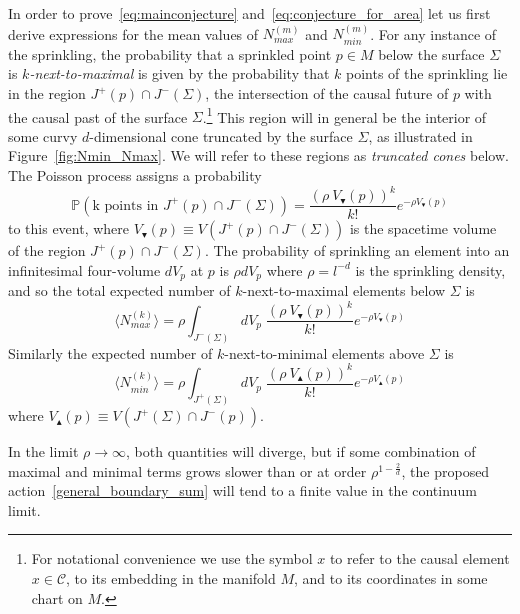 \documentclass[12pt]{article}
\newcommand{\be}{\begin{equation}}
\newcommand{\ee}{\end{equation}}
\begin{document}
In order to prove~\eqref{eq:mainconjecture} and~\eqref{eq:conjecture_for_area} let us first derive expressions for the mean values of $N_{max}^{(m)}$ and $N_{min}^{(m)}$. For any instance of the sprinkling, the probability that a sprinkled point $p\in M$ below the surface $\Sigma$ is $k$\emph{-next-to-maximal} is given by the probability that $k$ points of the sprinkling lie in the region $J^{+}(p)\cap J^{-}(\Sigma)$, the intersection of the causal future of $p$ with the causal past of the surface $\Sigma$.\footnote{For notational convenience we use the symbol $x$ to refer to the causal element $x\in\mathcal C$, to its embedding in the manifold $M$, and to its coordinates in some chart on $M$.} This region will in general be the interior of some curvy $d$-dimensional cone truncated by the surface $\Sigma$, as illustrated in Figure~\ref{fig:Nmin_Nmax}. We will refer to these regions as \emph{truncated cones} below. The Poisson process assigns a probability
\be\label{Poisson}
\mathbb P\left(\text{k points in }J^{+}(p)\cap J^{-}(\Sigma)\right)=\frac{\left(\rho\: V_\blacktriangledown(p)\right)^k}{k!}e^{-\rho V_\blacktriangledown(p)}
\ee
to this event, where $V_\blacktriangledown(p)\equiv V(J^{+}(p)\cap J^{-}(\Sigma))$ is the spacetime volume of the region $J^{+}(p)\cap J^{-}(\Sigma)$. The probability of sprinkling an element into an infinitesimal four-volume $dV_p$ at $p$ is $\rho dV_p$ where $\rho=l^{-d}$ is the sprinkling density, and so the total expected number of $k$-next-to-maximal elements below $\Sigma$ is
\be\label{eq:nmax}
\langle N_{max}^{(k)}\rangle =\rho\int_{J^{-}(\Sigma)}dV_p\; \frac{\left(\rho\: V_\blacktriangledown(p)\right)^k}{k!}e^{-\rho V_\blacktriangledown(p)}
\ee
Similarly the expected number of $k$-next-to-minimal elements above $\Sigma$ is
\be\label{eq:nmin}
\langle N_{min}^{(k)}\rangle =\rho\int_{J^{+}(\Sigma)}dV_p\; \frac{\left(\rho\: V_\blacktriangle(p)\right)^k}{k!}e^{-\rho V_\blacktriangle(p)}
\ee
where $V_\blacktriangle(p)\equiv V(J^{+}(\Sigma)\cap J^{-}(p))$.

In the limit $\rho\rightarrow\infty$, both quantities will diverge, but if some combination of maximal and minimal terms grows slower than or at order $\rho^{1-\frac2d}$, the proposed action~\eqref{general_boundary_sum} will tend to a finite value in the continuum limit.
\end{document}
